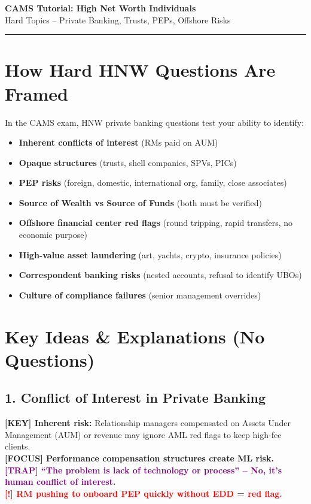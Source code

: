 \documentclass[10pt,a4paper]{article}
\newcommand{\redflag}[1]{\textcolor{red}{\textbf{[!] #1}}}
\newcommand{\examfocus}[1]{\textcolor{orange!80!black}{\textbf{[FOCUS] #1}}}
\newcommand{\trap}[1]{\textcolor{purple}{\textbf{[TRAP] #1}}}
\newcommand{\keyterm}[1]{\textcolor{red!80!black}{\textbf{[KEY] #1}}}
\begin{document}
\centering
{\Large \textbf{CAMS Tutorial: High Net Worth Individuals}} \\
{\large Hard Topics – Private Banking, Trusts, PEPs, Offshore Risks} \\
\vspace{0.2cm}
\rule{\textwidth}{0.5pt}
\vspace{0.2cm}

\tiny
\raggedright

\section*{How Hard HNW Questions Are Framed}
In the CAMS exam, HNW private banking questions test your ability to identify:
\begin{itemize}
\item \textbf{Inherent conflicts of interest} (RMs paid on AUM)
\item \textbf{Opaque structures} (trusts, shell companies, SPVs, PICs)
\item \textbf{PEP risks} (foreign, domestic, international org, family, close associates)
\item \textbf{Source of Wealth vs Source of Funds} (both must be verified)
\item \textbf{Offshore financial center red flags} (round tripping, rapid transfers, no economic purpose)
\item \textbf{High-value asset laundering} (art, yachts, crypto, insurance policies)
\item \textbf{Correspondent banking risks} (nested accounts, refusal to identify UBOs)
\item \textbf{Culture of compliance failures} (senior management overrides)
\end{itemize}

\section*{Key Ideas \& Explanations (No Questions)}

\subsection*{1. Conflict of Interest in Private Banking}
\keyterm{Inherent risk:} Relationship managers compensated on Assets Under Management (AUM) or revenue may ignore AML red flags to keep high-fee clients. \\
\examfocus{Performance compensation structures create ML risk.} \\
\trap{“The problem is lack of technology or process” – No, it’s human conflict of interest.} \\
\redflag{RM pushing to onboard PEP quickly without EDD = red flag.}
\end{document}
